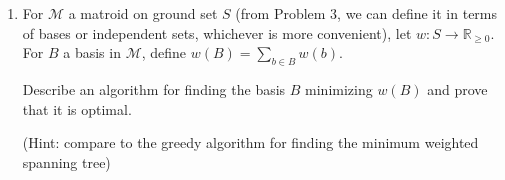 \documentclass[11pt,letterpaper]{article}
\newenvironment{solution}{\color{blue}\textit{Solution.}}{\color{black}}
\begin{document}
\begin{enumerate}
\begin{enumerate}
\begin{solution}
            Now let $A,B\in\mathcal{M}_I$ be bases, and $a\in{A}$. By the hereditary property, $A\setminus\{a\}\in{\mathcal{M}_I}$. Then, since all bases have the same cardinality, $|A\setminus\{a\}|=|B|-1$, so $|A|<|B|$. Thus, by the augmentation property, there exists $b \in B$ so that $(A\setminus\{a\}) \cup \{b\} \in \mathcal{M}_I$. Since one element was removed and a different element was added to $A$, we have $|A|=|(A\setminus\{a\}) \cup \{b\}|$. Thus $(A\setminus\{a\}) \cup \{b\}$ is a basis, and so the exchange property holds.
        \end{solution}
        
        \item For $\mathcal{M}_B$ a matroid defined in terms of its bases, show that two independent sets $A,B$ of $\mathcal{M}$ satisfy the augmentation property.
        
        (Compare this with Lemma 10.10 in the course text)
        \begin{solution}
            Let $A,B$ be two independent sets of $\mathcal{M}$ with $|A|<|B|$. Then let $X_A,X_B\in\mathcal{M}_B$ such that $A\subseteq X_A$ and $B\subseteq X_B$. Then by the exchange property, for some $a\in{A}$, we have $(X_A\setminus\{a\})\cup \{b\}$ for some $b\in{X_B}$. Assuming the hereditary property, since $A\cup\{b\}\subseteq (X_A\setminus\{a\})\cup \{b\}$, we have $A\cup\{b\}$ an independent set, so the augmentation property holds.
        \end{solution}

    \end{enumerate}
     
    \item For $\mathcal{M}$ a matroid on ground set $S$ (from Problem 3, we can define it in terms of bases or independent sets, whichever is more convenient), let $w:S \to \mathbb{R}_{\geq 0}$.
    For $B$ a basis in $\mathcal{M}$, define $w(B) = \sum_{b \in B} w(b)$.
    
    Describe an algorithm for finding the basis $B$ minimizing $w(B)$ and prove that it is optimal.
    
    (Hint: compare to the greedy algorithm for finding the minimum weighted spanning tree)

\end{enumerate}    
\end{document}
